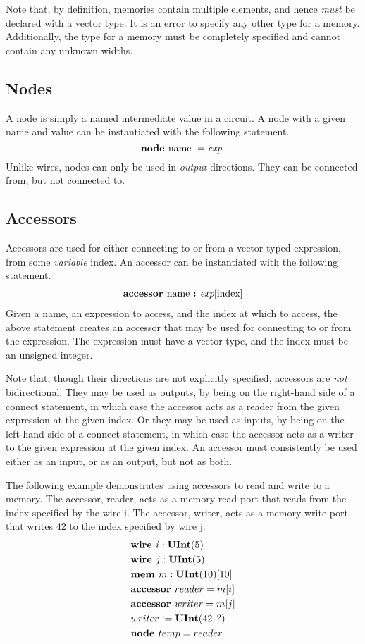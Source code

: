 \documentclass[12pt]{article}
\begin{document}
Note that, by definition, memories contain multiple elements, and hence {\em must} be declared with a vector type. It is an error to specify any other type for a memory. Additionally, the type for a memory must be completely specified and cannot contain any unknown widths.

\subsection{Nodes}
A node is simply a named intermediate value in a circuit. A node with a given name and value can be instantiated with the following statement.
\[
\text{\bf node\ } \text{name } = \text{\em exp\ } \\
\]
Unlike wires, nodes can only be used in {\em output} directions. They can be connected from, but not connected to.

\subsection{Accessors}
Accessors are used for either connecting to or from a vector-typed expression, from some {\em variable} index. An accessor can be instantiated with the following statement.
\[
\begin{aligned}
\text{\bf accessor\ } \text{name } \text{\bf :\ } \text{\em exp}[\text{index}] \\
\end{aligned}
\]
Given a name, an expression to access, and the index at which to access, the above statement creates an accessor that may be used for connecting to or from the expression. The expression must have a vector type, and the index must be an unsigned integer. 

Note that, though their directions are not explicitly specified, accessors are {\em not} bidirectional. They may be used as outputs, by being on the right-hand side of a connect statement, in which case the accessor acts as a reader from the given expression at the given index. Or they may be used as inputs, by being on the left-hand side of a connect statement, in which case the accessor acts as a writer to the given expression at the given index. An accessor must consistently be used either as an input, or as an output, but not as both. 

The following example demonstrates using accessors to read and write to a memory. The accessor, reader, acts as a memory read port that reads from the index specified by the wire i. The accessor, writer, acts as a memory write port that writes 42 to the index specified by wire j.
\[
\begin{aligned}
&\text{\bf wire\ } i : \text{\bf UInt}(5) \\
&\text{\bf wire\ } j : \text{\bf UInt}(5) \\
&\text{\bf mem\ } m : \text{\bf UInt}(10)[10] \\
&\text{\bf accessor\ } reader = m[i] \\
&\text{\bf accessor\ } writer = m[j] \\
&writer := \text{\bf UInt}(42, ?) \\
&\text{\bf node\ } temp = reader \\
\end{aligned}
\]
\end{document}
